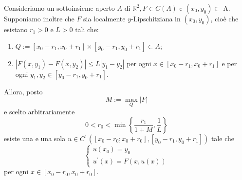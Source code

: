 \begin{shadedTheorem}[$**$]\label{thm: 5.2 Cauchy}
    Consideriamo un sottoinsieme aperto $A$ di $\mathbb{R}^{2}, F \in C(A)$ e $\left(x_{0}, y_{0}\right) \in$ A. Supponiamo inoltre che $F$ sia localmente $y$-Lipschitziana in $\left(x_{0}, y_{0}\right)$, cioè che esistano $r_{1}>0$ e $L>0$ tali che:
    \begin{enumerate}
        \item $Q:=\left[x_{0}-r_{1}, x_{0}+r_{1}\right] \times\left[y_{0}-r_{1}, y_{0}+r_{1}\right] \subset A$;
        \item $\left|F\left(x, y_{1}\right)-F\left(x, y_{2}\right)\right| \leq L\left|y_{1}-y_{2}\right|$ per ogni $x \in\left[x_{0}-r_{1}, x_{0}+r_{1}\right]$ e per ogni $y_{1}, y_{2} \in\left[y_{0}-r_{1}, y_{0}+r_{1}\right]$.
    \end{enumerate}
    Allora, posto
    \[M:=\max _{Q}|F|\]
    e scelto arbitrariamente
    \[0<r_{0}<\min \left\{\frac{r_{1}}{1+M}, \frac{1}{L}\right\}\]
    esiste una e una sola $u \in C^{1}\left(\left[x_{0}-r_{0}; x_{0}+r_{0}\right],\left[y_{0}-r_{1}, y_{0}+r_{1}\right]\right)$ tale che
    \[\begin{cases}u\left(x_{0}\right)=y_{0}\\u^{\prime}(x)=F(x, u(x))\end{cases}\tag{$*$}\label{eqPdC: teorema esistenza locale}\]
    per ogni $x \in\left[x_{0}-r_{0}, x_{0}+r_{0}\right]$.
\end{shadedTheorem}
